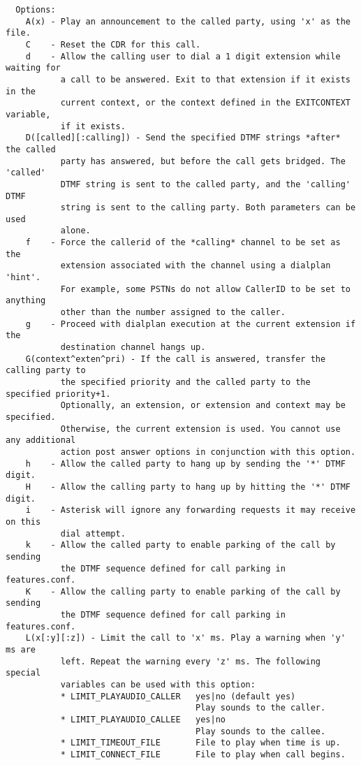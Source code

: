 \begin{verbatim}
  Options:
    A(x) - Play an announcement to the called party, using 'x' as the file.
    C    - Reset the CDR for this call.
    d    - Allow the calling user to dial a 1 digit extension while waiting for
           a call to be answered. Exit to that extension if it exists in the
           current context, or the context defined in the EXITCONTEXT variable,
           if it exists.
    D([called][:calling]) - Send the specified DTMF strings *after* the called
           party has answered, but before the call gets bridged. The 'called'
           DTMF string is sent to the called party, and the 'calling' DTMF
           string is sent to the calling party. Both parameters can be used
           alone.
    f    - Force the callerid of the *calling* channel to be set as the
           extension associated with the channel using a dialplan 'hint'.
           For example, some PSTNs do not allow CallerID to be set to anything
           other than the number assigned to the caller.
    g    - Proceed with dialplan execution at the current extension if the
           destination channel hangs up.
    G(context^exten^pri) - If the call is answered, transfer the calling party to
           the specified priority and the called party to the specified priority+1.
           Optionally, an extension, or extension and context may be specified. 
           Otherwise, the current extension is used. You cannot use any additional
           action post answer options in conjunction with this option.
    h    - Allow the called party to hang up by sending the '*' DTMF digit.
    H    - Allow the calling party to hang up by hitting the '*' DTMF digit.
    i    - Asterisk will ignore any forwarding requests it may receive on this
           dial attempt.
    k    - Allow the called party to enable parking of the call by sending
           the DTMF sequence defined for call parking in features.conf.
    K    - Allow the calling party to enable parking of the call by sending
           the DTMF sequence defined for call parking in features.conf.
    L(x[:y][:z]) - Limit the call to 'x' ms. Play a warning when 'y' ms are
           left. Repeat the warning every 'z' ms. The following special
           variables can be used with this option:
           * LIMIT_PLAYAUDIO_CALLER   yes|no (default yes)
                                      Play sounds to the caller.
           * LIMIT_PLAYAUDIO_CALLEE   yes|no
                                      Play sounds to the callee.
           * LIMIT_TIMEOUT_FILE       File to play when time is up.
           * LIMIT_CONNECT_FILE       File to play when call begins.

\end{verbatim}
